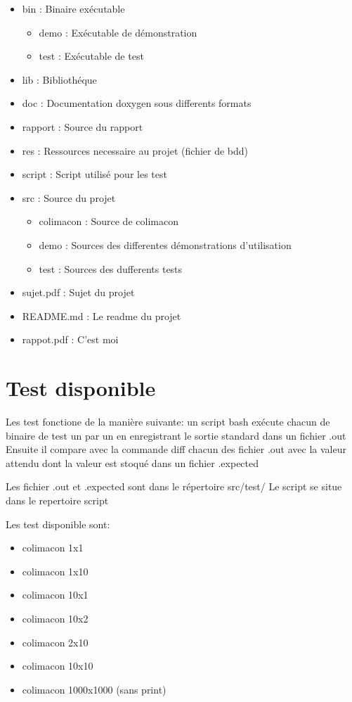 \documentclass[a4paper]{article}
\begin{document}
\begin{itemize}
\item bin : Binaire exécutable
\begin{itemize}
  \item demo : Exécutable de démonstration
  \item test : Exécutable de test
\end{itemize}
\item lib : Bibliothéque
\item doc : Documentation doxygen sous differents formats
\item rapport : Source du rapport
\item res : Ressources necessaire au projet (fichier de bdd)
\item script  : Script utilisé pour les test
\item src : Source du projet
\begin{itemize}
  \item colimacon : Source de colimacon
  \item demo  : Sources des differentes démonstrations d'utilisation
  \item test  : Sources des dufferents tests
\end{itemize}

\item sujet.pdf  : Sujet du projet
\item README.md  : Le readme du projet
\item rappot.pdf : C'est moi
\end{itemize}

\section{Test disponible}
Les test fonctione de la manière suivante: un script bash exécute chacun de binaire de
test un par un en enregistrant le sortie standard dans un fichier .out
Ensuite il compare avec la commande diff chacun des fichier .out avec la
valeur attendu dont la valeur est stoqué dans un fichier .expected

Les fichier .out et .expected sont dans le répertoire src/test/
Le script se situe dans le repertoire script

Les test disponible sont:
\begin{itemize}
  \item  colimacon 1x1
  \item  colimacon 1x10
  \item  colimacon 10x1
  \item  colimacon 10x2
  \item  colimacon 2x10
  \item  colimacon 10x10
  \item  colimacon 1000x1000 (sans print)
\end{itemize}
\end{document}
